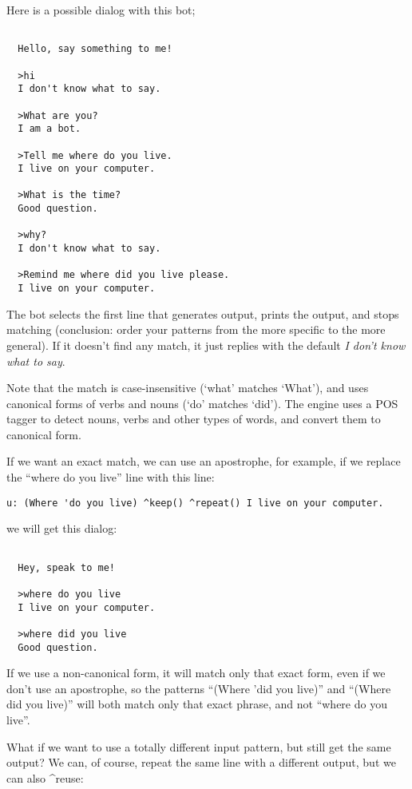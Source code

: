 \documentclass[]{article}
\begin{document}
Here is a possible dialog with this bot;

\begin{verbatim}

  Hello, say something to me!

  >hi
  I don't know what to say.

  >What are you?
  I am a bot.

  >Tell me where do you live.
  I live on your computer.

  >What is the time?
  Good question.

  >why?
  I don't know what to say.

  >Remind me where did you live please.
  I live on your computer.
\end{verbatim}

The bot selects the first line that generates output, prints the output,
and stops matching (conclusion: order your patterns from the more
specific to the more general). If it doesn't find any match, it just
replies with the default \emph{I don't know what to say}.

Note that the match is case-insensitive (`what' matches `What'), and
uses canonical forms of verbs and nouns (`do' matches `did'). The engine
uses a POS tagger to detect nouns, verbs and other types of words, and
convert them to canonical form.

If we want an exact match, we can use an apostrophe, for example, if we
replace the ``where do you live'' line with this line:

\begin{verbatim}
u: (Where 'do you live) ^keep() ^repeat() I live on your computer.
\end{verbatim}

we will get this dialog:

\begin{verbatim}

  Hey, speak to me!

  >where do you live
  I live on your computer.

  >where did you live
  Good question.
\end{verbatim}

If we use a non-canonical form, it will match only that exact form, even
if we don't use an apostrophe, so the patterns ``(Where 'did you live)''
and ``(Where did you live)'' will both match only that exact phrase, and
not ``where do you live''.

What if we want to use a totally different input pattern, but still get
the same output? We can, of course, repeat the same line with a
different output, but we can also \^{}reuse:
\end{document}
